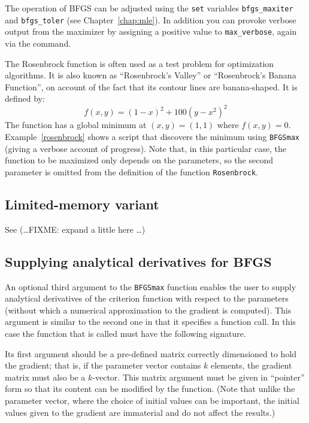 The operation of BFGS can be adjusted using the \texttt{set} variables
\verb+bfgs_maxiter+ and \verb+bfgs_toler+ (see
Chapter~\ref{chap:mle}).  In addition you can provoke verbose output
from the maximizer by assigning a positive value to
\verb|max_verbose|, again via the  command.

The Rosenbrock function is often used as a test problem for
optimization algorithms. It is also known as ``Rosenbrock's Valley''
or ``Rosenbrock's Banana Function'', on account of the fact that its
contour lines are banana-shaped. It is defined by:
%
\[
    f(x,y) = (1 - x)^2 + 100(y - x^2)^2
\]
%
The function has a global minimum at $(x,y) = (1,1)$ where $f(x,y) =
0$.  Example~\ref{rosenbrock} shows a  script that
discovers the minimum using \texttt{BFGSmax} (giving a verbose account
of progress). Note that, in this particular case, the function to be
maximized only depends on the parameters, so the second parameter is
omitted from the definition of the function \texttt{Rosenbrock}. 

\subsection{Limited-memory variant}
\label{sec:LBFGS}

See \cite{byrd-etal95} (\ldots FIXME: expand a little here \ldots)

\subsection{Supplying analytical derivatives for BFGS}
\label{sec:BFGSgrad}

An optional third argument to the \texttt{BFGSmax} function enables
the user to supply analytical derivatives of the criterion
function with respect to the parameters (without which a numerical
approximation to the gradient is computed).  This argument is
similar to the second one in that it specifies a function call.
In this case the function that is called must have the following
signature.  

Its first argument should be a pre-defined matrix correctly
dimensioned to hold the gradient; that is, if the parameter vector
contains $k$ elements, the gradient matrix must also be a $k$-vector.
This matrix argument must be given in ``pointer'' form so that its
content can be modified by the function.  (Note that unlike the
parameter vector, where the choice of initial values can be important,
the initial values given to the gradient are immaterial and do not
affect the results.)

